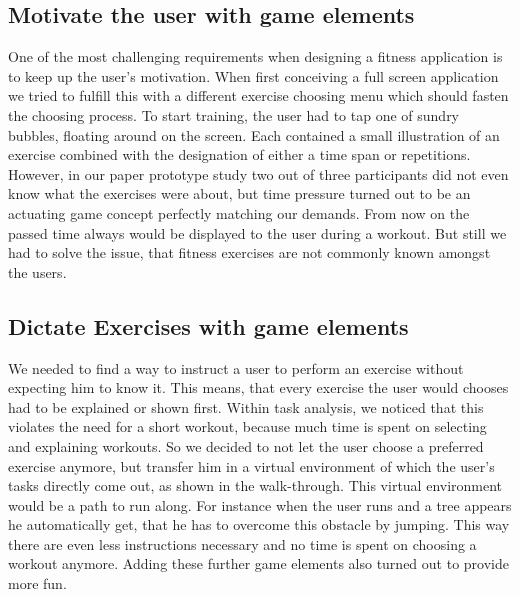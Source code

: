 \documentclass{sigchi}
\begin{document}
  \subsection{Motivate the user with game elements } %
  \label{sub:motivate_the_user_with_game_elements_}

    One of the most challenging requirements when designing a fitness application is to keep up the user's motivation. When first conceiving a full screen application we tried to fulfill this with a different exercise choosing menu which should fasten the choosing process. To start training, the user had to tap one of sundry bubbles, floating around on the screen. Each contained a small illustration of an exercise combined with the designation of either a time span or repetitions. However, in our paper prototype study two out of three participants did not even know what the exercises were about, but time pressure turned out to be an actuating game concept perfectly matching our demands. From now on the passed time always would be displayed to the user during a workout. But still we had to solve the issue, that fitness exercises are not commonly known amongst the users.

  \subsection{Dictate Exercises with game elements } %
  \label{sub:dictate_exercises_with_game_elements_}

    We needed to find a way to instruct a user to perform an exercise without expecting him to know it. This means, that every exercise the user would chooses had to be explained or shown first. Within task analysis, we noticed that this violates the need for a short workout, because much time is spent on selecting and explaining workouts. So we decided to not let the user choose a preferred exercise anymore, but transfer him in a virtual environment of which the user's tasks directly come out, as shown in the walk-through. This virtual environment would be a path to run along. For instance when the user runs and a tree appears he automatically get, that he has to overcome this obstacle by jumping. This way there are even less instructions necessary and no time is spent on choosing a workout anymore. Adding these further game elements also turned out to provide more fun.
\end{document}
